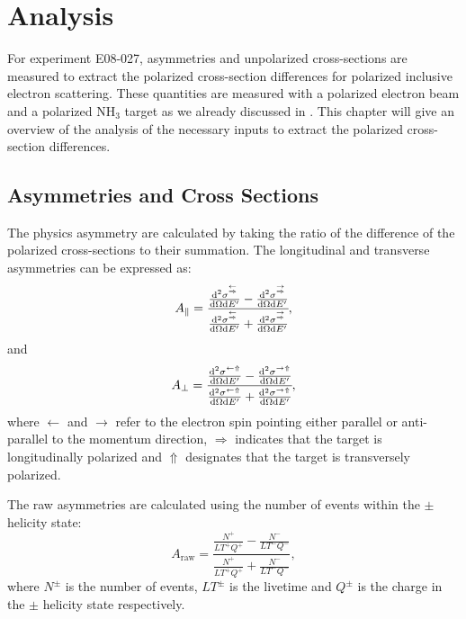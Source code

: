 
\chapter{Analysis}
\label{C7}

For experiment E08-027, asymmetries and unpolarized cross-sections are measured to extract the polarized cross-section differences for polarized inclusive electron scattering. These quantities are measured with a polarized electron beam and a polarized NH${}_3$ target as we already discussed in . This chapter will give an overview of the analysis of the necessary inputs to extract the polarized cross-section differences.

\section{Asymmetries and Cross Sections}
\label{C7S1}

The physics asymmetry are calculated by taking the ratio of the difference of the polarized cross-sections to their summation. The longitudinal and transverse asymmetries can be expressed as:
\begin{equation} \label{C7S1E1}
A_{\parallel}=\cfrac{\frac{\dd[2]{\sigma}^{\buildrel\leftarrow\over\Rightarrow}}{\dd{\Omega}\dd{E'}}-\frac{\dd[2]{\sigma}^{\buildrel\rightarrow\over\Rightarrow}}{\dd{\Omega}\dd{E'}}}{\frac{\dd[2]{\sigma}^{\buildrel\leftarrow\over\Rightarrow}}{\dd{\Omega}\dd{E'}}+\frac{\dd[2]{\sigma}^{\buildrel\rightarrow\over\Rightarrow}}{\dd{\Omega}\dd{E'}}},
\end{equation}
and
\begin{equation} \label{C7S1E2}
A_{\perp}=\cfrac{\frac{\dd[2]{\sigma}^{\leftarrow\Uparrow}}{\dd{\Omega}\dd{E'}}-\frac{\dd[2]{\sigma}^{\rightarrow\Uparrow}}{\dd{\Omega}\dd{E'}}}{\frac{\dd[2]{\sigma}^{\leftarrow\Uparrow}}{\dd{\Omega}\dd{E'}}+\frac{\dd[2]{\sigma}^{\rightarrow\Uparrow}}{\dd{\Omega}\dd{E'}}},
\end{equation}
where $\leftarrow$ and $\rightarrow$ refer to the electron spin pointing either parallel or anti-parallel to the momentum direction, $\Rightarrow$ indicates that the target is longitudinally polarized and $\Uparrow$ designates that the target is transversely polarized.

The raw asymmetries are calculated using the number of events within the $\pm$ helicity state:
\begin{equation} \label{C7S1E3}
A_{\mathrm{raw}}=\frac{\frac{N^+}{LT^+Q^+}-\frac{N^-}{LT^-Q^-}}{\frac{N^+}{LT^+Q^+}+\frac{N^-}{LT^-Q^-}},
\end{equation}
where $N^\pm$ is the number of events, $LT^{\pm}$ is the livetime and $Q^\pm$ is the charge in the $\pm$ helicity state respectively.

